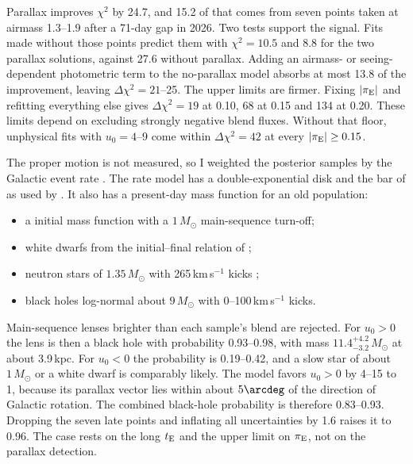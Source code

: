 \documentclass{aastex701}
\begin{document}
Parallax improves $\chi^2$ by 24.7, and 15.2 of that comes from seven points taken at airmass 1.3--1.9 after a 71-day gap in 2026. Two tests support the signal. Fits made without those points predict them with $\chi^2=10.5$ and 8.8 for the two parallax solutions, against 27.6 without parallax. Adding an airmass- or seeing-dependent photometric term to the no-parallax model absorbs at most 13.8 of the improvement, leaving $\Delta\chi^2=21$--25. The upper limits are firmer. Fixing $|\pi_{\rm E}|$ and refitting everything else gives $\Delta\chi^2=19$ at 0.10, 68 at 0.15 and 134 at 0.20. These limits depend on excluding strongly negative blend fluxes. Without that floor, unphysical fits with $u_0=4$--9 come within $\Delta\chi^2=42$ at every $|\pi_{\rm E}|\geq0.15$.

The proper motion is not measured, so I weighted the posterior samples by the Galactic event rate \citep{2011A&A...529A.102B}. The rate model has a double-exponential disk and the bar of \citet{1995ApJ...445..716D} as used by \citet{2003ApJ...592..172H}. It also has a present-day mass function for an old population:
\begin{itemize}
\item a \citet{2001MNRAS.322..231K} initial mass function with a $1\,M_\odot$ main-sequence turn-off;
\item white dwarfs from the initial--final relation of \citet{2008ApJ...676..594K};
\item neutron stars of $1.35\,M_\odot$ with 265\,km\,s$^{-1}$ kicks \citep{2005MNRAS.360..974H};
\item black holes log-normal about $9\,M_\odot$ with 0--100\,km\,s$^{-1}$ kicks.
\end{itemize}
Main-sequence lenses brighter than each sample's blend are rejected. For $u_0>0$ the lens is then a black hole with probability 0.93--0.98, with mass $11.4^{+4.2}_{-3.2}\,M_\odot$ at about 3.9\,kpc. For $u_0<0$ the probability is 0.19--0.42, and a slow star of about $1\,M_\odot$ or a white dwarf is comparably likely. The model favors $u_0>0$ by 4--15 to 1, because its parallax vector lies within about $5\arcdeg$ of the direction of Galactic rotation. The combined black-hole probability is therefore 0.83--0.93. Dropping the seven late points and inflating all uncertainties by 1.6 raises it to 0.96. The case rests on the long $t_{\rm E}$ and the upper limit on $\pi_{\rm E}$, not on the parallax detection.
\end{document}
